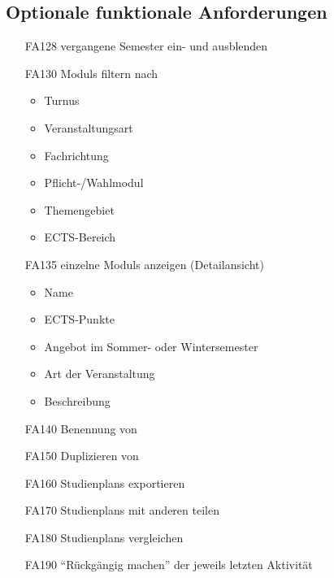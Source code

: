	\subsection{Optionale funktionale Anforderungen}
		\label{subsec:func_requirements-erweitert}
		\begin{itemize}[nosep]
		\item [FA128] vergangene Semester ein- und ausblenden
		\item [FA130] \glspl{Modul} filtern nach
		\begin{itemize}
		\item Turnus
		\item Veranstaltungsart
		\item Fachrichtung
		\item Pflicht-/Wahlmodul
		\item Themengebiet
		\item ECTS-Bereich
		\end{itemize}
		\item[FA135] einzelne \glspl{Modul} anzeigen (Detailansicht)
			\begin{itemize}[nosep]
						\item Name
						\item \gls{ECTS-Punkte}
						\item Angebot im Sommer- oder Wintersemester
						\item Art der Veranstaltung	
						\item Beschreibung
					\end{itemize}
		\item [FA140]	Benennung von
		\item [FA150] Duplizieren von 
		\item [FA160] \glspl{Studienplan} exportieren
		\item [FA170] \glspl{Studienplan} mit anderen  teilen
		\item[FA180] \glspl{Studienplan} vergleichen
		\item [FA190] \enquote{Rückgängig machen} der jeweils letzten Aktivität
		\end{itemize}

